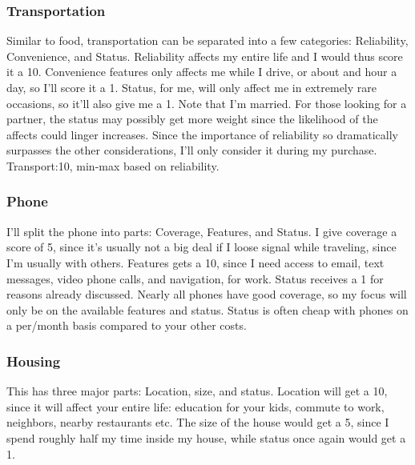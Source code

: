 \documentclass[11pt]{article}
\begin{document}
\subsubsection*{Transportation}
Similar to food, transportation can be separated into a few categories:
Reliability, Convenience, and Status. Reliability affects my entire life and I
would thus score it a 10. Convenience features only affects me while I drive, or
about and hour a day, so I'll score it a 1. Status, for me, will only affect me
in extremely rare occasions, so it'll also give me a 1. Note that I'm married.
For those looking for a partner, the status may possibly get more weight since
the likelihood of the affects could linger increases. Since the importance of
reliability so dramatically surpasses the other considerations, I'll only
consider it during my purchase. Transport:10, min-max based on reliability.
\subsubsection*{Phone}
I'll split the phone into parts: Coverage, Features, and Status.
I give coverage a score of 5, since it's usually not a big deal if I loose
signal while traveling, since I'm usually with others. Features gets a 10, since
I need access to email, text messages, video phone calls, and navigation, for
work. Status receives a 1 for reasons already discussed. Nearly all phones have
good coverage, so my focus will only be on the available features and status.
Status is often cheap with phones on a per/month basis compared to your other costs.
\subsubsection*{Housing}
This has three major parts: Location, size, and status. Location will get a 10,
since it will affect your entire life: education for your kids, commute to work,
neighbors, nearby restaurants etc. The size of the house would get a 5, since I
spend roughly half my time inside my house, while status once again would get a 1.
\end{document}
